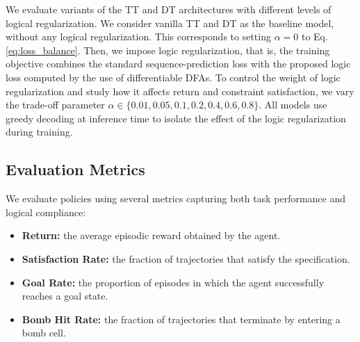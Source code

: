 We evaluate variants of the TT and DT architectures with different levels of logical regularization. We consider vanilla TT and DT as the baseline model, without any logical regularization. This corresponds to setting $\alpha=0$ to Eq. \ref{eq:loss_balance}. Then, we impose logic regularization, that is, the training objective combines the standard sequence-prediction loss with the proposed logic loss computed by the use of differentiable DFAs. To control the weight of logic regularization and study how it affects return and constraint satisfaction, we vary the trade-off parameter $\alpha \in \{0.01,0.05,0.1,0.2,0.4, 0.6, 0.8\}$. All models use greedy decoding at inference time to isolate the effect of the logic regularization during training. 

\subsection*{Evaluation Metrics}

We evaluate policies using several metrics capturing both task performance and logical compliance:
\begin{itemize}
    \item \textbf{Return: } the average episodic reward obtained by the agent.
    \item \textbf{Satisfaction Rate: } the fraction of trajectories that satisfy the \ltlf specification.%
    \item \textbf{Goal Rate: } the proportion of episodes in which the agent successfully reaches a goal state.
    \item \textbf{Bomb Hit Rate: } the fraction of trajectories that terminate by entering a bomb cell.
\end{itemize}
